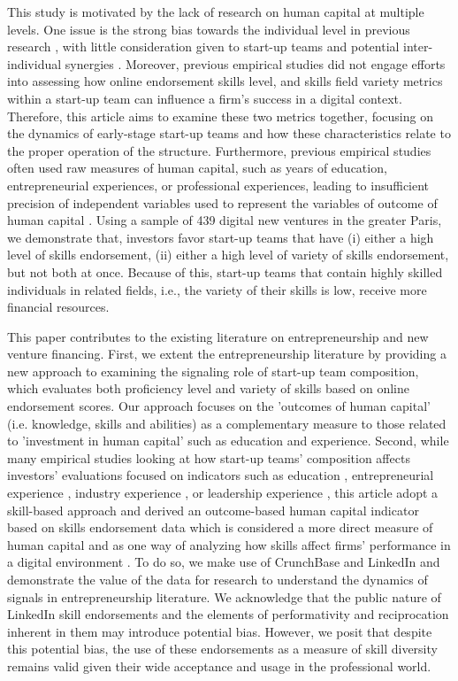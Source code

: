 \documentclass[12pt]{article}
\begin{document}
This study is motivated by the lack of research on human capital at multiple levels. One issue is the strong bias towards the individual level in previous research \citep{marvel2016human}, with little consideration given to start-up teams and potential inter-individual synergies \citep{knight2020start, sundermeier2022entrepreneurial}. Moreover, previous empirical studies did not engage efforts into assessing how online endorsement skills level, and skills field variety metrics within a start-up team can influence a firm's success in a digital context. Therefore, this article aims to examine these two metrics together, focusing on the dynamics of early-stage start-up teams and how these characteristics relate to the proper operation of the structure. Furthermore, previous empirical studies often used raw measures of human capital, such as years of education, entrepreneurial experiences, or professional experiences, leading to insufficient precision of independent variables used to represent the variables of outcome of human capital \citep{harrison2007s}. Using a sample of 439 digital new ventures in the greater Paris, we demonstrate that, investors favor start-up teams that have (i) either a high level of skills endorsement, (ii) either a high level of variety of skills endorsement, but not both at once. Because of this, start-up teams that contain highly skilled individuals in related fields, i.e., the variety of their skills is low, receive more financial resources.

This paper contributes to the existing literature on entrepreneurship and new venture financing. First, we extent the entrepreneurship literature by providing a new approach to examining the signaling role of start-up team composition, which evaluates both proficiency level and variety of skills based on online endorsement scores. Our approach focuses on the 'outcomes of human capital' (i.e. knowledge, skills and abilities) as a complementary measure to those related to 'investment in human capital' such as education and experience. Second, while many empirical studies looking at how start-up teams' composition affects investors' evaluations focused on indicators such as education \citep{franke2008venture}, entrepreneurial experience \citep{beckman2007early}, industry experience \citep{becker2015new}, or leadership experience \citep{hoenig2015quality}, this article adopt a skill-based approach and derived an outcome-based human capital indicator based on skills endorsement data which is considered a more direct measure of human capital and as one way of analyzing how skills affect firms' performance in a digital environment \citep{marvel2016human}. To do so, we make use of CrunchBase and LinkedIn and demonstrate the value of the data for research to understand the dynamics of signals in entrepreneurship literature. We acknowledge that the public nature of LinkedIn skill endorsements and the elements of performativity and reciprocation inherent in them may introduce potential bias. However, we posit that despite this potential bias, the use of these endorsements as a measure of skill diversity remains valid given their wide acceptance and usage in the professional world.
\end{document}
